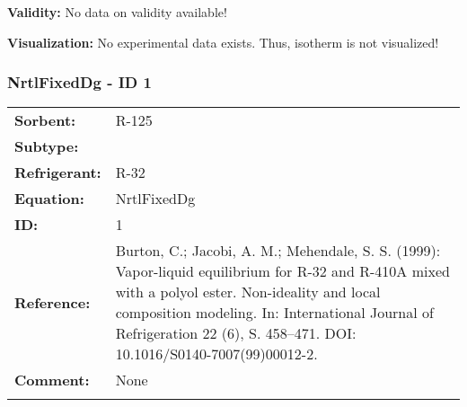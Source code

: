 \textbf{Validity:}
\newline
No data on validity available!
\newline

\textbf{Visualization:}
%
\newline
No experimental data exists. Thus, isotherm is not visualized!
%

\FloatBarrier
\newpage
\subsubsection{NrtlFixedDg - ID 1}
%
\begin{tabular}[l]{|lp{11.5cm}|}
\hline
\addlinespace

\textbf{Sorbent:} & R-125 \\
\textbf{Subtype:} &  \\
\textbf{Refrigerant:} & R-32 \\
\textbf{Equation:} & NrtlFixedDg \\
\textbf{ID:} & 1 \\
\textbf{Reference:} & Burton, C.; Jacobi, A. M.; Mehendale, S. S. (1999): Vapor-liquid equilibrium for R-32 and R-410A mixed with a polyol ester. Non-ideality and local composition modeling. In: International Journal of Refrigeration 22 (6), S. 458–471. DOI: 10.1016/S0140-7007(99)00012-2. \\
\textbf{Comment:} & None \\

\addlinespace
\hline
\end{tabular}
\newline

